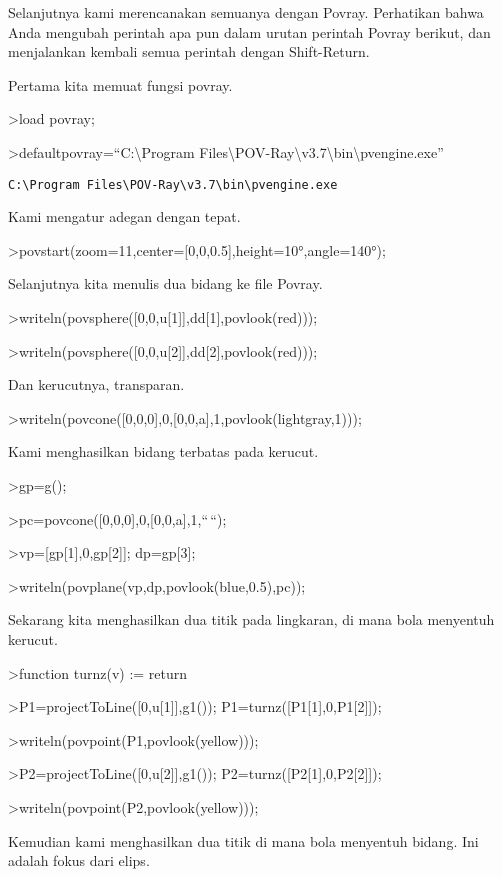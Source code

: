 \documentclass[
]{book}
\begin{document}
Selanjutnya kami merencanakan semuanya dengan Povray. Perhatikan bahwa Anda mengubah perintah apa pun dalam urutan perintah Povray berikut, dan menjalankan kembali semua perintah dengan Shift-Return.

Pertama kita memuat fungsi povray.

\textgreater load povray;

\textgreater defaultpovray=``C:\textbackslash Program Files\textbackslash POV-Ray\textbackslash v3.7\textbackslash bin\textbackslash pvengine.exe''

\begin{verbatim}
C:\Program Files\POV-Ray\v3.7\bin\pvengine.exe
\end{verbatim}

Kami mengatur adegan dengan tepat.

\textgreater povstart(zoom=11,center={[}0,0,0.5{]},height=10°,angle=140°);

Selanjutnya kita menulis dua bidang ke file Povray.

\textgreater writeln(povsphere({[}0,0,u{[}1{]}{]},dd{[}1{]},povlook(red)));

\textgreater writeln(povsphere({[}0,0,u{[}2{]}{]},dd{[}2{]},povlook(red)));

Dan kerucutnya, transparan.

\textgreater writeln(povcone({[}0,0,0{]},0,{[}0,0,a{]},1,povlook(lightgray,1)));

Kami menghasilkan bidang terbatas pada kerucut.

\textgreater gp=g();

\textgreater pc=povcone({[}0,0,0{]},0,{[}0,0,a{]},1,``\,``);

\textgreater vp={[}gp{[}1{]},0,gp{[}2{]}{]}; dp=gp{[}3{]};

\textgreater writeln(povplane(vp,dp,povlook(blue,0.5),pc));

Sekarang kita menghasilkan dua titik pada lingkaran, di mana bola menyentuh kerucut.

\textgreater function turnz(v) := return

\textgreater P1=projectToLine({[}0,u{[}1{]}{]},g1()); P1=turnz({[}P1{[}1{]},0,P1{[}2{]}{]});

\textgreater writeln(povpoint(P1,povlook(yellow)));

\textgreater P2=projectToLine({[}0,u{[}2{]}{]},g1()); P2=turnz({[}P2{[}1{]},0,P2{[}2{]}{]});

\textgreater writeln(povpoint(P2,povlook(yellow)));

Kemudian kami menghasilkan dua titik di mana bola menyentuh bidang. Ini adalah fokus dari elips.
\end{document}
